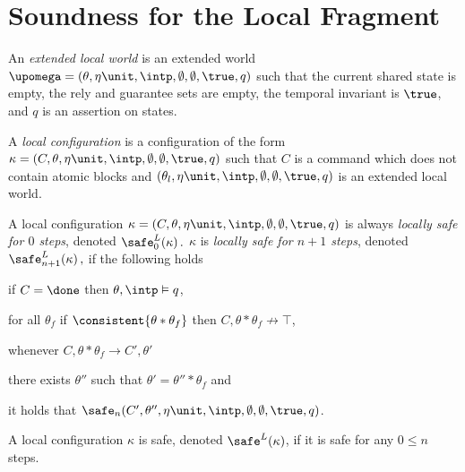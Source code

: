 %



\section{Soundness for the Local Fragment}\label{sec:soundloc}

\newcommand{\safeloccond}[1]{\noindent\textbf{\safelocref{#1}}}
\newcommand{\safelocref}[1]{Condition~(\ref{safeloc:#1})} %

\begin{defin}\label{def:extlocworld}
  An \emph{extended local world}  
  is an extended world $\upomega=(\theta,\eta\unit,\intp,\emptyset,\emptyset, \true, q)$ such that
  the current shared state is empty, 
  the rely and guarantee sets are empty,  
  the temporal invariant is $\true$, 
  and $q$ is an assertion on states. 
\end{defin}

\begin{defin}\label{def:localconfig}
  A \emph{local configuration}  is a configuration of the form
  $\kappa=(C,\theta,\eta\unit,\intp,\emptyset,\emptyset, \true, q)$  
  such that $C$ is a command which does not contain atomic blocks 
  and $(\theta_l,\eta\unit,\intp,\emptyset,\emptyset,\true, q)$ is an extended local world.
\end{defin}  

\begin{defin}\label{def:safelocal}
  A local configuration  $\kappa = (C,\theta,\eta\unit,\intp,\emptyset,\emptyset,\true, q)$ 
  is always \emph{locally safe for $0$ steps}, denoted 
  $
   \safe^L_0(\kappa)\,.
  $
  $\kappa$ is \emph{locally safe for $n + 1$ steps},  
  denoted 
  $
   \safe^L_{n+1}(\kappa)\,,
  $
  if the following  holds
  \begin{compactenum}[(a)]
    \item \label{safeloc:done} if 
     $C = \done$ then $\theta,\intp \vDash q$,
     
    \item \label{safeloc:noabort}  
     for all $\theta_f$ if $\consistent{\theta*\theta_f}$ then 
     $C,\theta*\theta_f \not\rightarrow \top$,  
     
    \item \label{safeloc:step} whenever $C,\theta*\theta_f \rightarrow C',\theta'$ 
     \begin{compactenum}[(1)] 
        \item 
        \label{safeloc:step:frame}
		there exists  $\theta''$ such that $\theta'=\theta''*\theta_f$ and       
        \item 
        \label{safeloc:step:ind}
        it holds that  $\safe_{n}(C',\theta'',\eta\unit,\intp,\emptyset,\emptyset,\true,q)$.       
  	 \end{compactenum}
  \end{compactenum}
  A local configuration $\kappa$ is safe, denoted $\safe^L(\kappa)$, if it is safe for any $0 \leq n$ steps.
\end{defin}


